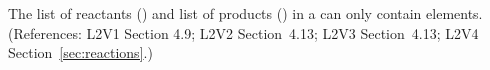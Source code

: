 The list of reactants () and list of products
() in a \Reaction can only contain
 elements.  (References: L2V1 Section 4.9; L2V2
Section~4.13; L2V3 Section~4.13; L2V4 Section~\ref{sec:reactions}.)
